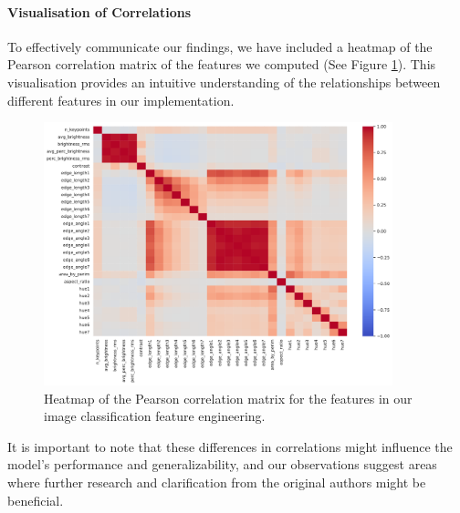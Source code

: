 \paragraph{Visualisation of Correlations}
To effectively communicate our findings, we have included a heatmap of the Pearson correlation matrix of the features we computed (See Figure \ref{fig:correlation_matrix}). This visualisation provides an intuitive understanding of the relationships between different features in our implementation.





\begin{figure}[h]
	\centering
	\includegraphics[width=0.9\textwidth]{report/figures/cv_corr_matrix1.pdf}
	\caption{Heatmap of the Pearson correlation matrix for the features in our image classification feature engineering.}
	\label{fig:correlation_matrix}
\end{figure}

It is important to note that these differences in correlations might influence the model's performance and generalizability, and our observations suggest areas where further research and clarification from the original authors might be beneficial.

